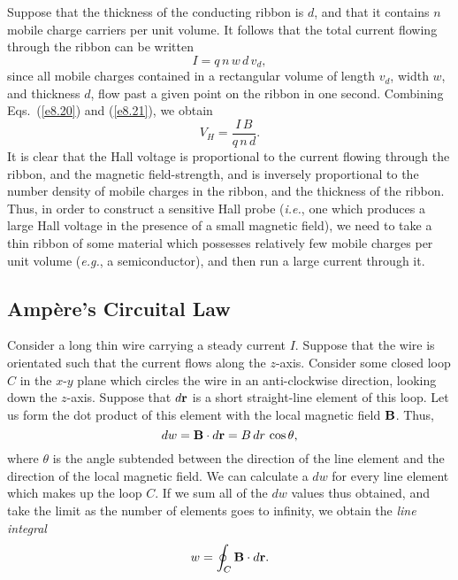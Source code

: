 Suppose that the thickness of the conducting ribbon is $d$, and that it contains
$n$ mobile charge carriers per unit volume. It follows that the total current
flowing through the ribbon can be written
\begin{equation}\label{e8.21}
I = q\,n\,w\,d\,v_d,
\end{equation}
since all mobile charges contained in a rectangular volume of length $v_d$, width
$w$, and thickness $d$, flow past a given point on the ribbon in one second. 
Combining Eqs.~(\ref{e8.20}) and (\ref{e8.21}), we  obtain
\begin{equation}
V_H = \frac{I\,B}{q\,n\,d}.
\end{equation}
It is clear that the Hall voltage is proportional to the current flowing through
the ribbon, and the magnetic field-strength, and is inversely proportional
to the number density of mobile charges in the ribbon, and the thickness of
the ribbon. Thus, in order to construct a sensitive Hall probe
({\em i.e.}, one which produces a large Hall voltage in the
presence of a small magnetic field), we need to take  a thin ribbon of
some material which possesses relatively few mobile charges per unit
volume ({\em e.g.}, a semiconductor), and then run a large current through it. 

\subsection{Amp\`{e}re's Circuital Law}\label{s8.7}
Consider a long thin wire carrying a steady current $I$. Suppose that the
wire is orientated such that the current flows along the $z$-axis. 
Consider some closed loop $C$ in the $x$-$y$ plane which circles the wire in
an anti-clockwise direction, looking down the $z$-axis. Suppose that
$d{\bf r}$ is a short straight-line element of this loop. 
Let us form the dot product of this element with the local magnetic field
${\bf B}$. Thus,
\begin{equation}
dw = {\bf B}\cdot d{\bf r}
= B\,d r\,\cos\theta,
\end{equation}
where $\theta$ is the angle subtended between the direction of the line element and
the direction of the local magnetic field. We can calculate a $dw$
for
every line element which makes up the loop $C$. If we sum all of the
$dw$ values thus obtained, and take the limit as the
number of  elements goes to infinity, 
we obtain the {\em line integral}
 \begin{equation}
w =\oint_C{\bf B}\cdot d{\bf r}.
\end{equation}


